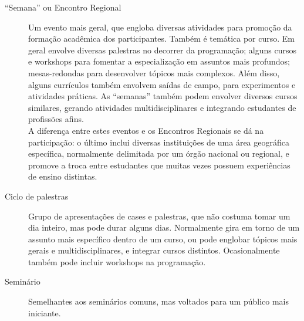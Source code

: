 \documentclass[12pt,a4paper,twoside,hyphens,english,brazil]{abntex2}
\begin{document}
\begin{description}
	\item[``Semana'' ou Encontro Regional] Um evento mais geral, que engloba diversas atividades para promoção da formação acadêmica dos participantes. Também é temática por curso. Em geral envolve diversas palestras no decorrer da programação; alguns cursos e workshops para fomentar a especialização em assuntos mais profundos; mesas-redondas para desenvolver tópicos mais complexos. Além disso, alguns currículos também envolvem saídas de campo, para experimentos e atividades práticas. As ``semanas'' também podem envolver diversos cursos similares, gerando atividades multidisciplinares e integrando estudantes de profissões afins.\\
	A diferença entre estes eventos e os Encontros Regionais se dá na participação: o último inclui diversas instituições de uma área geográfica específica, normalmente delimitada por um órgão nacional ou regional, e promove a troca entre estudantes que muitas vezes possuem experiências de ensino distintas.
	
	\item[Ciclo de palestras] Grupo de apresentações de cases e palestras, que não costuma tomar um dia inteiro, mas pode durar alguns dias. Normalmente gira em torno de um assunto mais específico dentro de um curso, ou pode englobar tópicos mais gerais e multidisciplinares, e integrar cursos distintos. Ocasionalmente também pode incluir workshops na programação.
		
	\item[Seminário] Semelhantes aos seminários comuns, mas voltados para um público mais iniciante.
\end{description}
\end{document}
